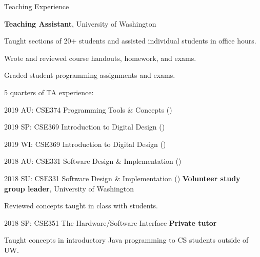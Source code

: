 \begin{rubric}{Teaching Experience}

\entry*[2018 -- 2019]%
	\textbf{Teaching Assistant}, University of Washington
	\par Taught sections of 20+ students and assisted individual students in office hours.
	\par Wrote and reviewed course handouts, homework, and exams.
	\par Graded student programming assignments and exams.
	\par 5 quarters of TA experience:
	\par 2019 AU: CSE374 Programming Tools \& Concepts (\pPirtleT{})
	\par 2019 SP: CSE369 Introduction to Digital Design (\pHsiaJ{})
	\par 2019 WI: CSE369 Introduction to Digital Design (\pHsiaJ{})
	\par 2018 AU: CSE331 Software Design \& Implementation (\pErnstM{})
	\par 2018 SU: CSE331 Software Design \& Implementation (\pPerlmutterL{})
\entry*[2018]%
	\textbf{Volunteer study group leader}, University of Washington
	\par Reviewed concepts taught in class with students.
	\par 2018 SP: CSE351 The Hardware/Software Interface
\entry*[2017]%
	\textbf{Private tutor}
	\par Taught concepts in introductory Java programming to CS students outside of UW.
\end{rubric}